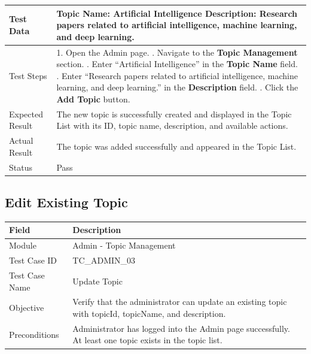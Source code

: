 \documentclass[12pt,a4paper]{article}
\begin{document}
{{\begin{longtable}{|p{4cm}|p{10cm}|}
	Test Data &
	Topic Name: Artificial Intelligence \newline
	Description: Research papers related to artificial intelligence, machine learning, and deep learning.
	\\ \hline
	
	Test Steps &
	1. Open the Admin page. \newline
	2. Navigate to the \textbf{Topic Management} section. \newline
	3. Enter ``Artificial Intelligence'' in the \textbf{Topic Name} field. \newline
	4. Enter ``Research papers related to artificial intelligence, machine learning, and deep learning.'' in the \textbf{Description} field. \newline
	5. Click the \textbf{Add Topic} button.
	\\ \hline
	
	Expected Result &
	The new topic is successfully created and displayed in the Topic List with its ID, topic name, description, and available actions. \\ \hline
	
	Actual Result &
	The topic was added successfully and appeared in the Topic List. \\ \hline
	
	Status & Pass \\ \hline
	
\end{longtable}
\subsection{Edit Existing Topic}
\begin{longtable}{|p{4cm}|p{10cm}|}
	\hline
	\textbf{Field} & \textbf{Description} \\ \hline
	
	Module & Admin - Topic Management \\ \hline
	
	Test Case ID & TC\_ADMIN\_03 \\ \hline
	
	Test Case Name & Update Topic \\ \hline
	
	Objective &
	Verify that the administrator can update an existing topic with topicId, topicName, and description. \\ \hline
	
	Preconditions &
	Administrator has logged into the Admin page successfully. \newline
	At least one topic exists in the topic list.
	\\ \hline
	

\end{longtable}}}
\end{document}
